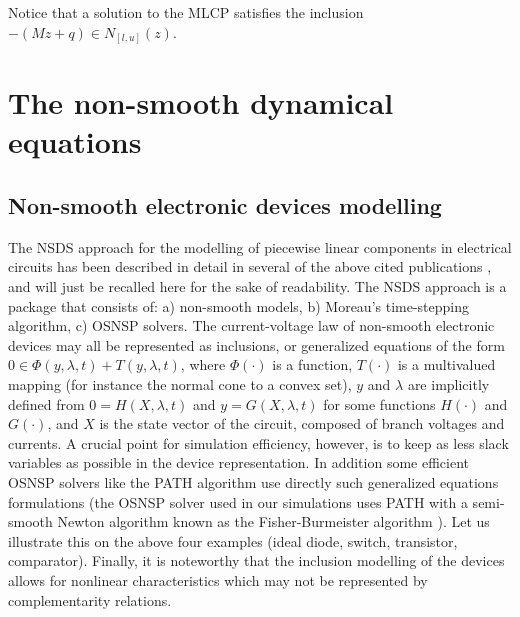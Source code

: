 Notice that a solution to the MLCP satisfies the inclusion $-(Mz+q) \in N_{[l,u]}(z)$. 


\section{The non-smooth dynamical equations}
\label{section2}

\subsection{Non-smooth electronic devices modelling}
\label{section21}

The NSDS approach for the  modelling of piecewise linear components in electrical circuits has been described in detail  in several of the above cited publications \cite{acary-brogliato2008,glocker2005,moreau1988,jean1999,moreau1999}, and will just be recalled here for the sake of readability. The NSDS approach is a package that consists of: a) non-smooth models, b) Moreau's time-stepping algorithm, c) OSNSP solvers. The current-voltage law of non-smooth electronic devices  may all be represented as inclusions, or generalized equations of the form $0 \in \Phi(y,\lambda,t) + T(y,\lambda,t)$, where $\Phi(\cdot)$ is a function, $T(\cdot)$ is a multivalued mapping (for instance the normal cone to a convex set), $y$ and $\lambda$ are implicitly defined from $0=H(X,\lambda,t)$ and $y=G(X,\lambda,t)$ for some functions $H(\cdot)$ and $G(\cdot)$, and $X$ is the state vector of the circuit, composed of branch voltages and currents. A crucial point for simulation efficiency, however, is to keep as less slack variables as possible in the device representation. In addition some efficient OSNSP solvers like the PATH algorithm use directly such generalized equations formulations (the OSNSP solver used in our simulations uses PATH with a semi-smooth Newton algorithm known as the Fisher-Burmeister algorithm \cite[Chapter 12]{acary-brogliato2008}). Let us illustrate this on the above four examples (ideal diode, switch, transistor, comparator). Finally, it is noteworthy that the inclusion modelling of the devices allows for nonlinear characteristics which may not be represented by complementarity relations. 



